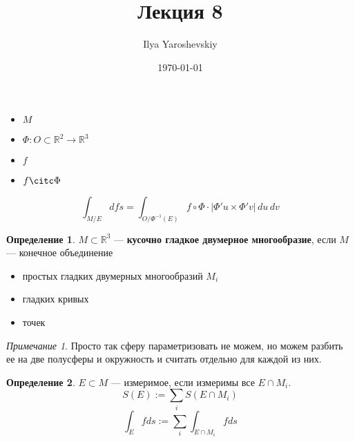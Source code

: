 \documentclass[english]{article}
\author{Ilya Yaroshevskiy}
\date{\today}
\title{Лекция 8}
\newcommand{\R}{\mathbb{R}}
\theoremstyle{plain}
\theoremstyle{remark}
\newtheorem*{remark}{Примечание}
\theoremstyle{definition}
\newtheorem*{definition}{Определение}
\begin{document}
\maketitle
\tableofcontents

\newcommand{\A}{\mathfrak{A}}
\newcommand{\esssup}{\mathop{\rm ess\,sup}\limits}


\begin{itemize}
\item \(M\)
\item \(\Phi: O \subset \R^2 \to \R^3\)
\item \(f\)
\item \(f \citc \Phi\)
\end{itemize}
\[ \int_{M/E} d fs = \int_{O/\Phi^{-1}(E)} f \circ \Phi \cdot |\Phi'u\times\Phi'v|\,du\,dv \]
\begin{definition}
\(M \subset \R^3\) --- \textbf{кусочно гладкое двумерное многообразие}, если
\(M\) --- конечное объединение
\begin{itemize}
\item простых гладких двумерных многообразий \(M_i\)
\item гладких кривых
\item точек
\end{itemize}
\end{definition}
\begin{remark}
Просто так сферу параметризовать не можем, но можем разбить ее на две полусферы и окружность и считать отдельно для каждой из них.
\end{remark}
\begin{definition}
\(E \subset M\) --- измеримое, если измеримы все \(E \cap M_i\). \\
\[S(E) := \sum_i S(E\cap M_i) \]
\[ \int_E f ds := \sum_i \int_{E \cap M_i} f ds \]
\end{definition}
\end{document}
